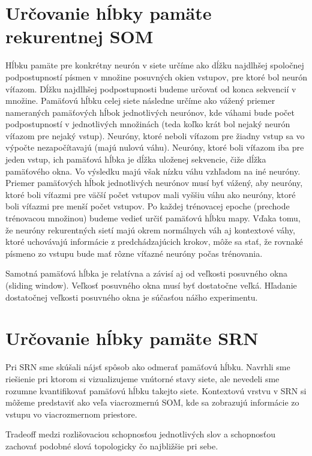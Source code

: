 \section{Určovanie hĺbky pamäte rekurentnej SOM}
Hĺbku pamäte pre konkrétny neurón v siete určíme ako dĺžku najdlhšej spoločnej
podpostupností písmen v množine posuvných okien vstupov, pre ktoré bol neurón víťazom.
Dĺžku najdlhšej podpostupnosti budeme určovať od konca sekvencií v množine.
Pamäťovú hĺbku celej siete následne určíme ako vážený priemer nameraných pamäťových hĺbok jednotlivých neurónov, 
kde váhami bude počet podpostupností v jednotlivých množinách (teda koľko krát bol nejaký neurón víťazom pre nejaký vstup).
Neuróny, ktoré neboli víťazom pre žiadny vstup sa vo výpočte nezapočítavajú (majú nulovú váhu).
Neuróny, ktoré boli víťazom iba pre jeden vstup, ich pamäťová hĺbka je dĺžka uloženej sekvencie, čiže dĺžka pamäťového okna.
Vo výsledku majú však nízku váhu vzhľadom na iné neuróny.
Priemer pamäťových hĺbok jednotlivých neurónov musí byť vážený, aby neuróny, 
ktoré boli víťazmi pre väčší počet vstupov mali vyššiu váhu ako neuróny, ktoré boli víťazmi pre menší počet vstupov.
Po každej trénovacej epoche (prechode trénovacou množinou) budeme vedieť určiť pamäťovú hĺbku mapy.
Vďaka tomu, že neuróny rekurentných sietí majú okrem normálnych váh aj kontextové váhy, 
ktoré uchovávajú informácie z predchádzajúcich krokov, môže sa stať, že rovnaké písmeno zo vstupu 
bude mať rôzne víťazné neuróny počas trénovania.

Samotná pamäťová hĺbka je relatívna a závisí aj od veľkosti posuvného okna (sliding window).
Veľkosť posuvného okna musí byť dostatočne veľká. Hľadanie dostatočnej veľkosti posuvného
okna je súčasťou nášho experimentu.

\section{Určovanie hĺbky pamäte SRN}
Pri SRN sme skúšali nájsť spôsob ako odmerať pamäťovú hĺbku. 
Navrhli sme riešienie pri ktorom si vizualizujeme vnútorné stavy siete, ale
nevedeli sme rozumne kvantifikovať pamäťovú hĺbku takejto siete. Kontextovú vrstvu v SRN si 
môžeme predstaviť ako veľa viacrozmernú SOM, kde sa zobrazujú informácie zo vstupu
vo viacrozmernom priestore.

Tradeoff medzi rozlišovaciou schopnosťou jednotlivých slov a schopnosťou
zachovať podobné slová topologicky čo najbližšie pri sebe.



